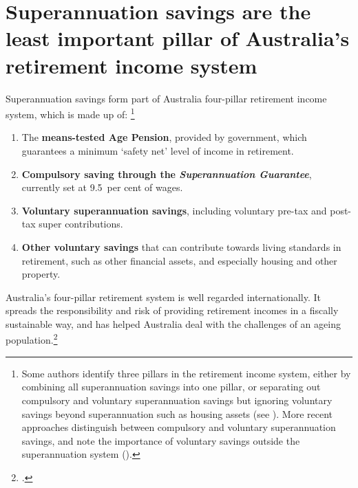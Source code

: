 \section{Superannuation savings are the least important pillar of Australia's retirement income system}\label{sec:SUPER-Super-savings-are-least-important-pillar}\label{sec:SUPER-2-1}
Superannuation savings form part of Australia four-pillar retirement income system, which is made up of:%
\footnote{%
Some authors identify three pillars in the retirement income system, either by combining all superannuation savings into one pillar, or separating out compulsory and voluntary superannuation savings but ignoring voluntary savings beyond superannuation such as housing assets (see \textcite[][9]{Treasury2009aftsRetirementIncomeStrategicIssues}). More recent approaches distinguish between compulsory and voluntary superannuation savings, and note the importance of voluntary savings outside the superannuation system (\textcite[][17]{Derby2015}). 
}%
\mynobreakpar
\begin{enumerate}
\raggedright
\item The \textbf{means-tested Age Pension}, provided by government, which guarantees a minimum `safety net' level of income in retirement.
\item \textbf{Compulsory saving through the \emph{Superannuation Guarantee}}, currently set at 9.5~per cent of wages.
\item \textbf{Voluntary superannuation savings}, including voluntary pre-tax and post-tax super contributions.
\item \textbf{Other voluntary savings} that can contribute towards living standards in retirement, such as other financial assets, and especially housing and other property.
\end{enumerate}

Australia’s four-pillar retirement system is well regarded internationally. It spreads the responsibility and risk of providing retirement incomes in a fiscally sustainable way, and has helped Australia deal with the challenges of an ageing population.\footcite{Mercer2015} 


